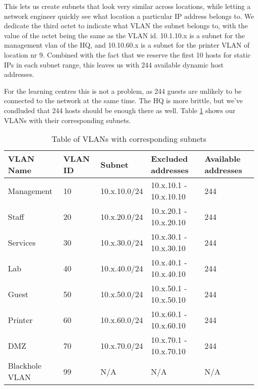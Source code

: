 This lets us create subnets that look very similar across locations, while letting a network engineer quickly see what location a particular IP address belongs to. We dedicate the third octet to indicate what VLAN the subnet belongs to, with the value of the octet being the same as the VLAN id. 10.1.10.x is a subnet for the management vlan of the HQ, and 10.10.60.x is a subnet for the printer VLAN of location nr 9. Combined with the fact that we reserve the first 10 hosts for static IPs in each subnet range, this leaves us with 244 available dynamic host addresses.

For the learning centres this is not a problem, as 244 guests are unlikely to be connected to the network at the same time. The HQ is more brittle, but we've condluded that 244 hosts should be enough there as well. Table \ref{vlansubnettable} shows our VLANs with their corresponding subnets.


\begin{table}[H]
\caption{Table of VLANs with corresponding subnets}
\label{vlansubnettable}
\begin{tabular}{|l|l|l|l|l|}
\hline
\textbf{VLAN Name} & \textbf{VLAN ID} & \textbf{Subnet} & \textbf{Excluded addresses} & \textbf{Available addresses} \\ \hline

Management     & 10      & 10.x.10.0/24 & 10.x.10.1 - 10.x.10.10 & 244 \\ \hline
Staff          & 20      & 10.x.20.0/24 & 10.x.20.1 - 10.x.20.10 & 244 \\ \hline
Services       & 30      & 10.x.30.0/24 & 10.x.30.1 - 10.x.30.10 & 244 \\ \hline
Lab            & 40      & 10.x.40.0/24 & 10.x.40.1 - 10.x.40.10 & 244 \\ \hline
Guest          & 50      & 10.x.50.0/24 & 10.x.50.1 - 10.x.50.10 & 244 \\ \hline
Printer        & 60      & 10.x.60.0/24 & 10.x.60.1 - 10.x.60.10 & 244 \\ \hline
DMZ            & 70      & 10.x.70.0/24 & 10.x.70.1 - 10.x.70.10 & 244 \\ \hline
Blackhole VLAN & 99      & N/A          & N/A                    & N/A \\ \hline
\end{tabular}
\end{table}


